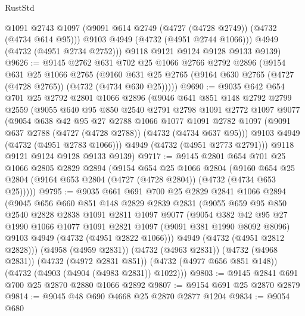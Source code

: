 \begin{lexlean}{RustStd}
\begin{coremodule}
          @1091
          @2743
          @1097
          (@9091 @614 @2749 (@4727 (@4728 @2749)) (@4732 (@4734 @614 @95)))
          @9103
          @4949
          (@4732 (@4951 @2744 @1066)))
        @4949
        (@4732 (@4951 @2734 @2752)))
      @9118
      @9121
      @9124
      @9128
      @9133
      @9139)
@9626 := @9145
    @2762
    @631
    @702
    @25
    @1066
    @2766
    @2792
    @2896
    (@9154
      @631
      @25
      @1066
      @2765
      (@9160 @631 @25 @2765 (@9164 @630 @2765 (@4727 (@4728 @2765)) (@4732 (@4734 @630 @25)))))
@9690 := @9035
    @642
    @654
    @701
    @25
    @2792
    @2801
    @1066
    @2896
    (@9046
      @641
      @851
      @148
      @2792
      @2799
      @2559
      (@9055
        @640
        @95
        @850
        @2540
        @2791
        @2798
        @1091
        @2772
        @1097
        @9077
        (@9054
          @638
          @42
          @95
          @27
          @2788
          @1066
          @1077
          @1091
          @2782
          @1097
          (@9091 @637 @2788 (@4727 (@4728 @2788)) (@4732 (@4734 @637 @95)))
          @9103
          @4949
          (@4732 (@4951 @2783 @1066)))
        @4949
        (@4732 (@4951 @2773 @2791)))
      @9118
      @9121
      @9124
      @9128
      @9133
      @9139)
@9717 := @9145
    @2801
    @654
    @701
    @25
    @1066
    @2805
    @2829
    @2894
    (@9154
      @654
      @25
      @1066
      @2804
      (@9160 @654 @25 @2804 (@9164 @653 @2804 (@4727 (@4728 @2804)) (@4732 (@4734 @653 @25)))))
@9795 := @9035
    @661
    @691
    @700
    @25
    @2829
    @2841
    @1066
    @2894
    (@9045
      @656
      @660
      @851
      @148
      @2829
      @2839
      @2831
      (@9055
        @659
        @95
        @850
        @2540
        @2828
        @2838
        @1091
        @2811
        @1097
        @9077
        (@9054
          @382
          @42
          @95
          @27
          @1990
          @1066
          @1077
          @1091
          @2821
          @1097
          (@9091 @381 @1990 @8092 @8096)
          @9103
          @4949
          (@4732 (@4951 @2822 @1066)))
        @4949
        (@4732 (@4951 @2812 @2828)))
      (@4958 (@4959 @2831))
      (@4732 (@4963 @2831))
      (@4732 (@4968 @2831))
      (@4732 (@4972 @2831 @851))
      (@4732 (@4977 @656 @851 @148))
      (@4732 (@4903 (@4904 (@4983 @2831)) @1022)))
@9803 := @9145 @2841 @691 @700 @25 @2870 @2880 @1066 @2892
@9807 := @9154 @691 @25 @2870 @2879
@9814 := @9045 @48 @690 @4668 @25 @2870 @2877 @1204
@9834 := @9054
    @680

\end{coremodule}
\end{lexlean}
